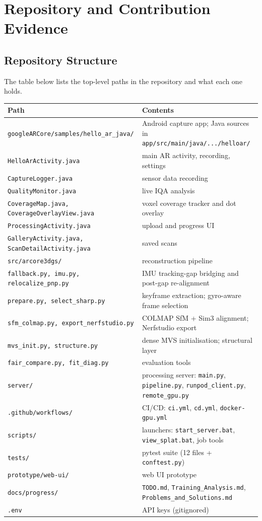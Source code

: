 \chapter{Repository and Contribution Evidence}

\section{Repository Structure}

The table below lists the top-level paths in the repository and what each one holds.
\begin{longtable}{p{}p{}}
\toprule
\textbf{Path} & \textbf{Contents} \\
\midrule
\endhead
\texttt{googleARCore/samples/}\allowbreak\texttt{hello\_ar\_java/} & Android capture app; Java sources in \texttt{app/src/main/java/.../helloar/} \\
\quad\texttt{HelloArActivity.java} & main AR activity, recording, settings \\
\quad\texttt{CaptureLogger.java} & sensor data recording \\
\quad\texttt{QualityMonitor.java} & live IQA analysis \\
\quad\texttt{CoverageMap.java, CoverageOverlayView.java} & voxel coverage tracker and dot overlay \\
\quad\texttt{ProcessingActivity.java} & upload and progress UI \\
\quad\texttt{GalleryActivity.java, ScanDetailActivity.java} & saved scans \\
\texttt{src/arcore3dgs/} & reconstruction pipeline \\
\quad\texttt{fallback.py, imu.py, relocalize\_pnp.py} & IMU tracking-gap bridging and post-gap re-alignment \\
\quad\texttt{prepare.py, select\_sharp.py} & keyframe extraction; gyro-aware frame selection \\
\quad\texttt{sfm\_colmap.py, export\_nerfstudio.py} & COLMAP SfM + Sim3 alignment; Nerfstudio export \\
\quad\texttt{mvs\_init.py, structure.py} & dense MVS initialisation; structural layer \\
\quad\texttt{fair\_compare.py, fit\_diag.py} & evaluation tools \\
\texttt{server/} & processing server: \texttt{main.py}, \texttt{pipeline.py}, \texttt{runpod\_client.py}, \texttt{remote\_gpu.py} \\
\texttt{.github/workflows/} & CI/CD: \texttt{ci.yml}, \texttt{cd.yml}, \texttt{docker-gpu.yml} \\
\texttt{scripts/} & launchers: \texttt{start\_server.bat}, \texttt{view\_splat.bat}, job tools \\
\texttt{tests/} & pytest suite (12 files + \texttt{conftest.py}) \\
\texttt{prototype/web-ui/} & web UI prototype \\
\texttt{docs/progress/} & \texttt{TODO.md}, \texttt{Training\_Analysis.md}, \texttt{Problems\_and\_Solutions.md} \\
\texttt{.env} & API keys (gitignored) \\
\bottomrule
\end{longtable}

